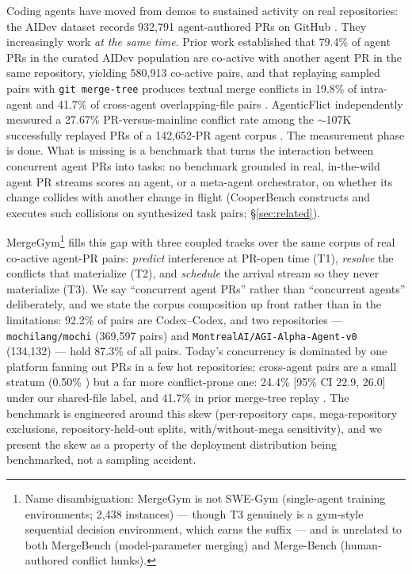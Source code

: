 \documentclass{article}
\begin{document}
Coding agents have moved from demos to sustained activity on real repositories: the AIDev dataset records 932{,}791 agent-authored PRs on GitHub \citep{li2026aidev,li2025rise}. %
They increasingly work \emph{at the same time}. Prior work established that 79.4\% of agent PRs in the curated AIDev population are co-active with another agent PR in the same repository, yielding 580{,}913 co-active pairs, and that replaying sampled pairs with \texttt{git merge-tree} produces textual merge conflicts in 19.8\% of intra-agent and 41.7\% of cross-agent overlapping-file pairs \citep{xu2026agentprs}. %
AgenticFlict independently measured a 27.67\% PR-versus-mainline conflict rate among the $\sim$107K successfully replayed PRs of a 142{,}652-PR agent corpus \citep{ogenrwot2026agenticflict}. %
The measurement phase is done. What is missing is a benchmark that turns the interaction between concurrent agent PRs into tasks: no benchmark grounded in real, in-the-wild agent PR streams scores an agent, or a meta-agent orchestrator, on whether its change collides with another change in flight (CooperBench \citep{khatua2026cooperbench} constructs and executes such collisions on synthesized task pairs; \S\ref{sec:related}).

MergeGym\footnote{Name disambiguation: MergeGym is not SWE-Gym \citep{pan2025swegym} (single-agent training environments; 2{,}438 instances) --- though T3 genuinely is a gym-style sequential decision environment, which earns the suffix --- and is unrelated to both MergeBench \citep{mergebench2025llm} (model-parameter merging) and Merge-Bench \citep{schesch2026mergebench} (human-authored conflict hunks).} %
fills this gap with three coupled tracks over the same corpus of real co-active agent-PR pairs: \emph{predict} interference at PR-open time (T1), \emph{resolve} the conflicts that materialize (T2), and \emph{schedule} the arrival stream so they never materialize (T3). We say ``concurrent agent PRs'' rather than ``concurrent agents'' deliberately, and we state the corpus composition up front rather than in the limitations: 92.2\% of pairs are Codex--Codex, and two repositories --- \texttt{mochilang/mochi} (369{,}597 pairs) and \texttt{MontrealAI/AGI-Alpha-Agent-v0} (134{,}132) --- hold 87.3\% of all pairs. %
Today's concurrency is dominated by one platform fanning out PRs in a few hot repositories; cross-agent pairs are a small stratum (0.50\% \citep{xu2026agentprs}) but a far more conflict-prone one: 24.4\% [95\% CI 22.9, 26.0] under our shared-file label, and 41.7\% in prior merge-tree replay \citep{xu2026agentprs}. %
The benchmark is engineered around this skew (per-repository caps, mega-repository exclusions, repository-held-out splits, with/without-mega sensitivity), and we present the skew as a property of the deployment distribution being benchmarked, not a sampling accident.
\end{document}
